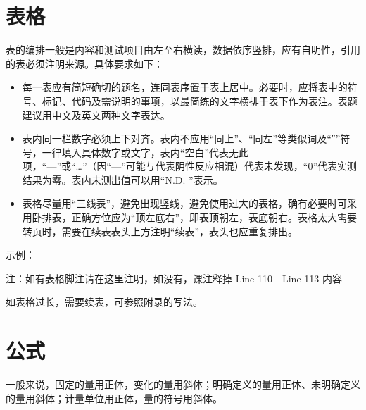 \section{表格}
表的编排一般是内容和测试项目由左至右横读，数据依序竖排，应有自明性，引用的表必须注明来源。具体要求如下：
\begin{itemize}
    \item 每一表应有简短确切的题名，连同表序置于表上居中。必要时，应将表中的符号、标记、代码及需说明的事项，以最简练的文字横排于表下作为表注。表题建议用中文及英文两种文字表达。
    \item 表内同一栏数字必须上下对齐。表内不应用“同上”、“同左”等类似词及“″”符号，一律填入具体数字或文字，表内“空白”代表无此项，“—”或“…”（因“—”可能与代表阴性反应相混）代表未发现，“0”代表实测结果为零。表内未测出值可以用“N.D. ”表示。
    \item 表格尽量用“三线表”，避免出现竖线，避免使用过大的表格，确有必要时可采用卧排表，正确方位应为“顶左底右”，即表顶朝左，表底朝右。表格太大需要转页时，需要在续表表头上方注明“续表”，表头也应重复排出。
\end{itemize}
示例：

\begin{table}[htbp!]
\centering
{}
\renewcommand\arraystretch{1.2}
\label{tab:1-1}


\vspace{0.3em}
\raggedright
\footnotesize
注：如有表格脚注请在这里注明，如没有，课注释掉 Line 110 - Line 113 内容
\end{table}

如表格过长，需要续表，可参照附录的写法。

\section{公式}
一般来说，固定的量用正体，变化的量用斜体；明确定义的量用正体、未明确定义的量用斜体；计量单位用正体，量的符号用斜体。 

